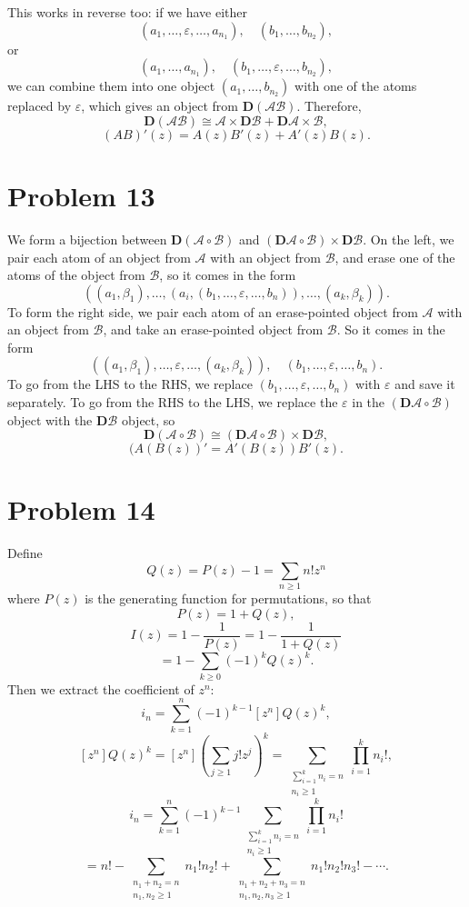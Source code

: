 \documentclass{article}
\newcommand{\mcA}{\mathcal{A}}
\newcommand{\mcB}{\mathcal{B}}
\newcommand{\bigp}[1]{\left(#1\right)}
\newcommand{\eps}{\varepsilon}
\begin{document}
This works in reverse too: if we have either
$$(a_1, \ldots, \eps, \ldots, a_{n_1}), \quad (b_1, \ldots, b_{n_2}),$$
or
$$(a_1, \ldots, a_{n_1}), \quad (b_1, \ldots, \eps, \ldots, b_{n_2}),$$
we can combine them into one object $(a_1, \ldots, b_{n_2})$ with one of the atoms replaced by $\eps$, which gives an object from $\mathbf{D}(\mcA \mcB)$. Therefore,
$$\mathbf{D}(\mcA \mcB) \cong \mcA \times \mathbf{D}\mcB + \mathbf{D}\mcA \times \mcB,$$
$$(AB)'(z) = A(z)B'(z) + A'(z)B(z).$$

\section*{Problem 13}
We form a bijection between $\mathbf{D}(\mcA \circ \mcB)$ and $(\mathbf{D}\mcA \circ \mcB) \times \mathbf{D}\mcB$. On the left, we pair each atom of an object from $\mcA$ with an object from $\mcB$, and erase one of the atoms of the object from $\mcB$, so it comes in the form
$$((a_1, \beta_1), \ldots, (a_i, (b_1, \ldots, \eps, \ldots, b_n)), \ldots, (a_k, \beta_k)).$$
To form the right side, we pair each atom of an erase-pointed object from $\mcA$ with an object from $\mcB$, and take an erase-pointed object from $\mcB$. So it comes in the form
$$((a_1, \beta_1), \ldots, \eps, \ldots, (a_k, \beta_k)), \quad (b_1, \ldots, \eps, \ldots, b_n).$$
To go from the LHS to the RHS, we replace $(b_1, \ldots, \eps, \ldots, b_n)$ with $\eps$ and save it separately. To go from the RHS to the LHS, we replace the $\eps$ in the $(\mathbf{D}\mcA \circ \mcB)$ object with the $\mathbf{D}\mcB$ object, so
$$\mathbf{D}(\mcA \circ \mcB) \cong (\mathbf{D}\mcA \circ \mcB) \times \mathbf{D}\mcB,$$
$$(A(B(z))' = A'(B(z))B'(z).$$

\section*{Problem 14}
Define
$$Q(z) = P(z) - 1 = \sum_{n \ge 1} n!z^n$$
where $P(z)$ is the generating function for permutations, so that
$$P(z) = 1 + Q(z),$$
$$I(z) = 1 - \frac{1}{P(z)} = 1 - \frac{1}{1 + Q(z)}$$
$$= 1 - \sum_{k \ge 0} (-1)^kQ(z)^k.$$
Then we extract the coefficient of $z^n$:
$$i_n = \sum_{k = 1}^n (-1)^{k - 1}[z^n]Q(z)^k,$$
$$[z^n]Q(z)^k = [z^n]\bigp{\sum_{j \ge 1} j!z^j}^k = \sum_{\substack{\sum_{i = 1}^k n_i= n\\n_i \ge 1}} \prod_{i = 1}^k n_i!,$$
$$i_n = \sum_{k = 1}^n (-1)^{k - 1}\sum_{\substack{\sum_{i = 1}^k n_i= n\\n_i \ge 1}} \prod_{i = 1}^k n_i!$$
$$= n! - \sum_{\substack{n_1 + n_2 = n\\n_1, n_2 \ge 1}}n_1!n_2! + \sum_{\substack{n_1 + n_2 + n_3 = n\\n_1, n_2, n_3 \ge 1}}n_1!n_2!n_3! - \cdots.$$
\end{document}
